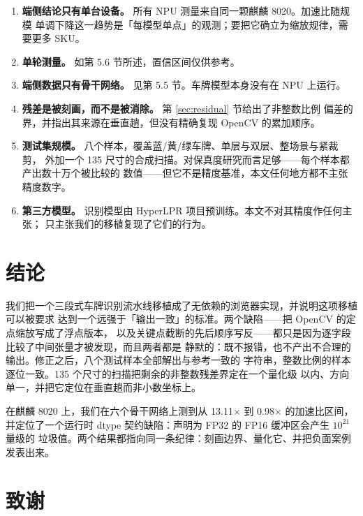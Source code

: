 \documentclass[UTF8,a4paper,11pt]{ctexart}
\begin{document}
\begin{enumerate}
\item \textbf{端侧结论只有单台设备。} 所有 NPU 测量来自同一颗麒麟 8020。加速比随规模
单调下降这一趋势是「每模型单点」的观测；要把它确立为缩放规律，需要更多 SKU。
\item \textbf{单轮测量。} 如第 5.6 节所述，置信区间仅供参考。
\item \textbf{端侧数据只有骨干网络。} 见第 5.5 节。车牌模型本身没有在 NPU 上运行。
\item \textbf{残差是被刻画，而不是被消除。} 第 \ref{sec:residual} 节给出了非整数比例
偏差的界，并指出其来源在垂直趟，但没有精确复现 OpenCV 的累加顺序。
\item \textbf{测试集规模。} 八个样本，覆盖蓝/黄/绿车牌、单层与双层、整场景与紧裁剪，
外加一个 135 尺寸的合成扫描。对保真度研究而言足够——每个样本都产出数十万个被比较的
数值——但它不是精度基准，本文任何地方都不主张精度数字。
\item \textbf{第三方模型。} 识别模型由 HyperLPR 项目预训练。本文不对其精度作任何主张；
只主张我们的移植复现了它们的行为。
\end{enumerate}

\section{结论}

我们把一个三段式车牌识别流水线移植成了无依赖的浏览器实现，并说明这项移植可以被要求
达到一个远强于「输出一致」的标准。两个缺陷——把 OpenCV 的定点缩放写成了浮点版本，
以及关键点截断的先后顺序写反——都只是因为逐字段比较了中间张量才被发现，而且两者都是
静默的：既不报错，也不产出不合理的输出。修正之后，八个测试样本全部解出与参考一致的
字符串，整数比例的样本逐位一致。135 个尺寸的扫描把剩余的非整数残差界定在一个量化级
以内、方向单一，并把它定位在垂直趟而非小数坐标上。

在麒麟 8020 上，我们在六个骨干网络上测到从 13.11$\times$ 到 0.98$\times$ 的加速比区间，
并定位了一个运行时 dtype 契约缺陷：声明为 FP32 的 FP16 缓冲区会产生 $10^{21}$ 量级的
垃圾值。两个结果都指向同一条纪律：刻画边界、量化它、并把负面案例发表出来。

\section*{致谢}
\end{document}
